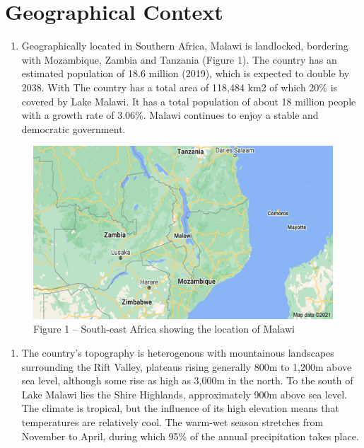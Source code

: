\documentclass[
]{book}
\providecommand{\tightlist}{%
  \setlength{\itemsep}{0pt}\setlength{\parskip}{0pt}}
\begin{document}
\hypertarget{geographical-context}{%
\section{Geographical Context}\label{geographical-context}}

\begin{enumerate}
\def\labelenumi{\arabic{enumi}.}
\setcounter{enumi}{13}
\tightlist
\item
  Geographically located in Southern Africa, Malawi is landlocked, bordering with Mozambique, Zambia and Tanzania (Figure 1). The country has an estimated population of 18.6 million (2019), which is expected to double by 2038. With The country has a total area of 118,484 km2 of which 20\% is covered by Lake Malawi. It has a total population of about 18 million people with a growth rate of 3.06\%. Malawi continues to enjoy a stable and democratic government.
\end{enumerate}

\begin{figure}
\centering
\includegraphics{images/location.png}
\caption{Figure 1 -- South-east Africa showing the location of Malawi}
\end{figure}

\begin{enumerate}
\def\labelenumi{\arabic{enumi}.}
\setcounter{enumi}{14}
\tightlist
\item
  The country's topography is heterogenous with mountainous landscapes surrounding the Rift Valley, plateaus rising generally 800m to 1,200m above sea level, although some rise as high as 3,000m in the north. To the south of Lake Malawi lies the Shire Highlands, approximately 900m above sea level. The climate is tropical, but the influence of its high elevation means that temperatures are relatively cool. The warm-wet season stretches from November to April, during which 95\% of the annual precipitation takes place.
\end{enumerate}
\end{document}
